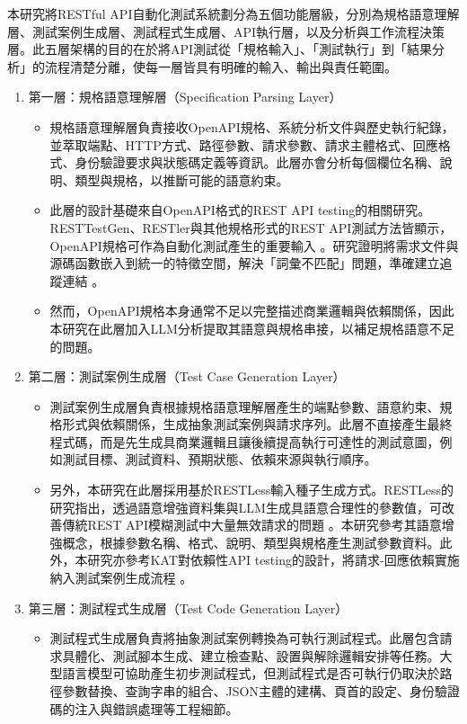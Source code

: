 \begin{ZhChapter}
\text 本研究將RESTful API自動化測試系統劃分為五個功能層級，分別為規格語意理解層、測試案例生成層、測試程式生成層、API執行層，以及分析與工作流程決策層。此五層架構的目的在於將API測試從「規格輸入」、「測試執行」到「結果分析」的流程清楚分離，使每一層皆具有明確的輸入、輸出與責任範圍。
\begin{enumerate}
  \item 第一層：規格語意理解層（Specification Parsing Layer）
  \begin{itemize}
    \item 規格語意理解層負責接收OpenAPI規格、系統分析文件與歷史執行紀錄，並萃取端點、HTTP方式、路徑參數、請求參數、請求主體格式、回應格式、身份驗證要求與狀態碼定義等資訊。此層亦會分析每個欄位名稱、說明、類型與規格，以推斷可能的語意約束。
    \item 此層的設計基礎來自OpenAPI格式的REST API testing的相關研究。RESTTestGen、RESTler與其他規格形式的REST API測試方法皆顯示，OpenAPI規格可作為自動化測試產生的重要輸入 \parencite{Viglianisi2020RESTTESTGEN, Corradini2022RestTestGen, Atlidakis2019RESTler}。研究證明將需求文件與源碼函數嵌入到統一的特徵空間，解決「詞彙不匹配」問題，準確建立追蹤連結 \parencite{Dai2023ConstructingTraceability}。
    \item 然而，OpenAPI規格本身通常不足以完整描述商業邏輯與依賴關係，因此本研究在此層加入LLM分析提取其語意與規格串接，以補足規格語意不足的問題。
  \end{itemize}
  \item 第二層：測試案例生成層（Test Case Generation Layer）
  \begin{itemize}
    \item 測試案例生成層負責根據規格語意理解層產生的端點參數、語意約束、規格形式與依賴關係，生成抽象測試案例與請求序列。此層不直接產生最終程式碼，而是先生成具商業邏輯且讓後續提高執行可達性的測試意圖，例如測試目標、測試資料、預期狀態、依賴來源與執行順序。
    \item 另外，本研究在此層採用基於RESTLess輸入種子生成方式。RESTLess的研究指出，透過語意增強資料集與LLM生成具語意合理性的參數值，可改善傳統REST API模糊測試中大量無效請求的問題 \parencite{Zheng2024RESTLess}。本研究參考其語意增強概念，根據參數名稱、格式、說明、類型與規格產生測試參數資料。此外，本研究亦參考KAT對依賴性API testing的設計，將請求-回應依賴實施納入測試案例生成流程 \parencite{Nguyen2024KAT}。
  \end{itemize}
  \item 第三層：測試程式生成層（Test Code Generation Layer）
  \begin{itemize}
    \item 測試程式生成層負責將抽象測試案例轉換為可執行測試程式。此層包含請求具體化、測試腳本生成、建立檢查點、設置與解除邏輯安排等任務。大型語言模型可協助產生初步測試程式，但測試程式是否可執行仍取決於路徑參數替換、查詢字串的組合、JSON主體的建構、頁首的設定、身份驗證碼的注入與錯誤處理等工程細節。

\end{itemize}
\end{enumerate}
\end{ZhChapter}
